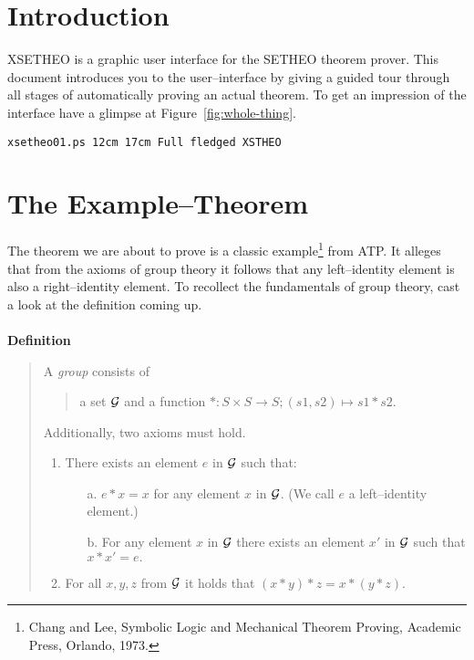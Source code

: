 %

\newcommand\bild[5]{{\tt #1 #2 #3 #4 }\label{#5}}

\section{Introduction} 
XSETHEO is a graphic user interface for the SETHEO theorem prover.
This document introduces you to the user--interface by giving a 
guided tour through all stages of automatically proving an actual theorem.
To get an impression of the interface have a glimpse at Figure~\ref{fig:whole-thing}.

\bild{xsetheo01.ps}{12cm}{17cm}{Full fledged XSTHEO}{fig:whole-thing}

\section{The Example--Theorem} 
The theorem we are about to prove is a classic example\footnote{Chang and Lee, 
Symbolic Logic and Mechanical Theorem Proving, Academic Press, Orlando, 1973.} from ATP.
It alleges that from the axioms of group theory it follows that any
left--identity element is also a right--identity element. 
To recollect the fundamentals of group theory, cast a look at the definition coming up.
\\ \\
{\bf Definition}
\begin{quote}
A {\it group\/} consists of 
\begin{quote}
a set $\cal G$ 
and 
a function $* : S \times S \rightarrow S; (s1,s2) \mapsto s1 * s2$. 
\end{quote}
Additionally, two axioms must hold.
\begin{enumerate}
\item There exists an element $e$ in $\cal G$ such that: \\
\begin{itemize}
\item[a.]$e * x = x$ for any element $x$ in $\cal G$. 
(We call $e$ a left--identity element.) 
\item[b.] For any element $x$ in $\cal G$ there exists an element $x'$ in $\cal G$ such that 
$x * x' = e.$ \\ 
\end{itemize}
\item For all $x, y, z$ from $\cal G$ it holds that $(x * y) * z = x * (y * z)$.
\end{enumerate}
\end{quote}

